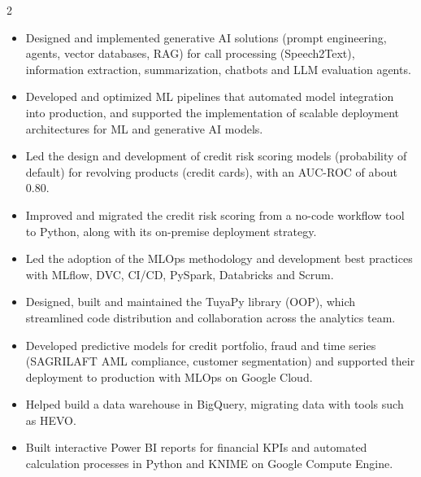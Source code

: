 \documentclass[10pt,a4paper,ragged2e,withhyper]{altacv}
\begin{document}
\begin{paracol}{2}
\begin{itemize}
\item Designed and implemented generative AI solutions (prompt engineering, agents, vector databases, RAG) for call processing (Speech2Text), information extraction, summarization, chatbots and LLM evaluation agents.
\item Developed and optimized ML pipelines that automated model integration into production, and supported the implementation of scalable deployment architectures for ML and generative AI models.
\end{itemize}

\switchcolumn


\begin{itemize}
\item Led the design and development of credit risk scoring models (probability of default) for revolving products (credit cards), with an \mbox{AUC-ROC} of about 0.80.
\item Improved and migrated the credit risk scoring from a no-code workflow tool to Python, along with its \mbox{on-premise} deployment strategy.
\item Led the adoption of the MLOps methodology and development best practices with MLflow, DVC, CI/CD, PySpark, Databricks and Scrum.
\item Designed, built and maintained the TuyaPy library (OOP), which streamlined code distribution and collaboration across the analytics team.
\end{itemize}

\divider


\begin{itemize}
\item Developed predictive models for credit portfolio, fraud and time series (SAGRILAFT AML compliance, customer segmentation) and supported their deployment to production with MLOps on Google Cloud.
\item Helped build a data warehouse in BigQuery, migrating data with tools such as HEVO.
\item Built interactive Power BI reports for financial KPIs and automated calculation processes in Python and KNIME on Google Compute Engine.
\end{itemize}


\end{paracol}
\end{document}
